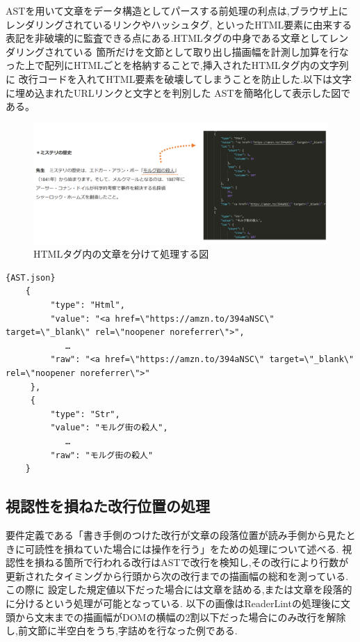 ASTを用いて文章をデータ構造としてパースする前処理の利点は,ブラウザ上にレンダリングされているリンクやハッシュタグ,
といったHTML要素に由来する表記を非破壊的に監査できる点にある.HTMLタグの中身である文章としてレンダリングされている
箇所だけを文節として取り出し描画幅を計測し加算を行なった上で配列にHTMLごとを格納することで,挿入されたHTMLタグ内の文字列に
改行コードを入れてHTML要素を破壊してしまうことを防止した.以下は文字に埋め込まれたURLリンクと文字とを判別した
ASTを簡略化して表示した図である。

\begin{figure}[H]
    \centering
    \label{fig:image16}
    \includegraphics[width=0.7\columnwidth]{image/03/img7.png}
	\caption[HTMLタグ内の文章を分けて処理する図]{HTMLタグ内の文章を分けて処理する図} \footnotemark[7]
\end{figure}


\begin{lstlisting}{AST.json}
    {
         "type": "Html",
         "value": "<a href=\"https://amzn.to/394aNSC\" target=\"_blank\" rel=\"noopener noreferrer\">",
            …
         "raw": "<a href=\"https://amzn.to/394aNSC\" target=\"_blank\" rel=\"noopener noreferrer\">"
     },
     {
         "type": "Str",
         "value": "モルグ街の殺人",
            …
         "raw": "モルグ街の殺人"
    }
\end{lstlisting}

\subsection{視認性を損ねた改行位置の処理}
要件定義である「書き手側のつけた改行が文章の段落位置が読み手側から見たときに可読性を損ねていた場合には操作を行う」をための処理について述べる.
視認性を損ねる箇所で行われる改行はASTで改行を検知し,その改行により行数が更新されたタイミングから行頭から次の改行までの描画幅の総和を測っている.この際に
設定した規定値以下だった場合には文章を詰める,または文章を段落的に分けるという処理が可能となっている.
以下の画像はReaderLintの処理後に文頭から文末までの描画幅がDOMの横幅の2割以下だった場合にのみ改行を解除し,前文節に半空白をうち,字詰めを行なった例である.


